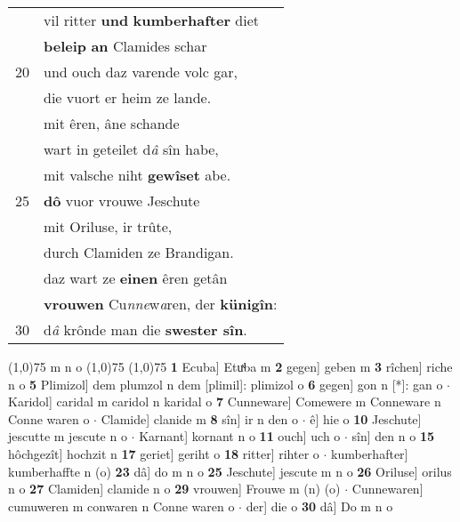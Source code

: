 \documentclass[8pt,a4paper,notitlepage]{article}
\begin{document}
\begin{table}[ht]
\begin{minipage}[t]{0.5\linewidth}
\begin{tabular}{rl}
 & vil ritter \textbf{und} \textbf{kumberhafter} diet\\ 
 & \textbf{beleip} \textbf{an} Clamides schar\\ 
20 & und ouch daz varende volc gar,\\ 
 & die vuort er heim ze lande.\\ 
 & mit êren, âne schande\\ 
 & wart in geteilet d\textit{â} sîn habe,\\ 
 & mit valsche niht \textbf{gewîset} abe.\\ 
25 & \textbf{dô} vuor vrouwe Jeschute\\ 
 & mit Oriluse, ir trûte,\\ 
 & durch Clamiden ze Brandigan.\\ 
 & daz wart ze \textbf{einen} êren getân\\ 
 & \textbf{vrouwen} Cu\textit{nne}w\textit{a}ren, der \textbf{künigîn}:\\ 
30 & d\textit{â} krônde man die \textbf{swester sîn}.\\ 
\end{tabular}
\scriptsize
\line(1,0){75} \newline
m n o \newline
\line(1,0){75} \newline
\newline
\line(1,0){75} \newline
\textbf{1} Ecuba] Etuͯba m \textbf{2} gegen] geben m \textbf{3} rîchen] riche n o \textbf{5} Plimizol] dem plumzol n dem [plimil]: plimizol o \textbf{6} gegen] gon n [*]: gan o  $\cdot$ Karidol] caridal m caridol n karidal o \textbf{7} Cunneware] Comewere m Conneware n Conne waren o  $\cdot$ Clamide] clanide m \textbf{8} sîn] ir n den o  $\cdot$ ê] hie o \textbf{10} Jeschute] jescutte m jescute n o  $\cdot$ Karnant] kornant n o \textbf{11} ouch] uch o  $\cdot$ sîn] den n o \textbf{15} hôchgezît] hochzit n \textbf{17} geriet] geriht o \textbf{18} ritter] rihter o  $\cdot$ kumberhafter] kumberhaffte n (o) \textbf{23} dâ] do m n o \textbf{25} Jeschute] jescute m n o \textbf{26} Oriluse] orilus n o \textbf{27} Clamiden] clamide n o \textbf{29} vrouwen] Frouwe m (n) (o)  $\cdot$ Cunnewaren] cumuweren m conwaren n Conne waren o  $\cdot$ der] die o \textbf{30} dâ] Do m n o \newline
\end{minipage}
\end{table}
\newpage
\end{document}
